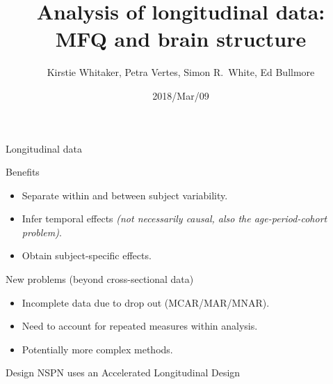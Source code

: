


\title{Analysis of longitudinal data:\\MFQ and brain structure}
\author{Kirstie Whitaker, Petra Vertes, Simon R.~White, Ed Bullmore}
\date{2018/Mar/09}



\maketitle








\begin{frame}{Longitudinal data}
  
  \begin{block}{Benefits}
    \begin{itemize}
    \item Separate within and between subject variability.
    \item Infer temporal effects \emph{(not necessarily causal, also
        the age-period-cohort problem)}.
    \item Obtain subject-specific effects.
    \end{itemize}
  \end{block}

  \pause

  \begin{block}{New problems (beyond cross-sectional data)}
    \begin{itemize}
    \item Incomplete data due to drop out (MCAR/MAR/MNAR).
    \item Need to account for repeated measures within analysis.
    \item Potentially more complex methods.
    \end{itemize}
  \end{block}
  \pause
  \begin{block}{Design}
    NSPN uses an Accelerated Longitudinal Design
  \end{block}

\end{frame}

